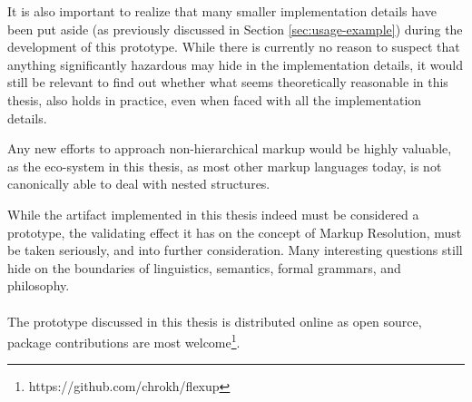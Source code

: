 \documentclass{scrreprt}
\begin{document}
It is also important to realize that many smaller implementation details have been put aside (as previously discussed in Section \ref{sec:usage-example}) during the development of this prototype. While there is currently no reason to suspect that anything significantly hazardous may hide in the implementation details, it would still be relevant to find out whether what seems theoretically reasonable in this thesis, also holds in practice, even when faced with all the implementation details.

Any new efforts to approach non-hierarchical markup would be highly valuable, as the eco-system in this thesis, as most other markup languages today, is not canonically able to deal with nested structures.

While the artifact implemented in this thesis indeed must be considered a prototype, the validating effect it has on the concept of Markup Resolution, must be taken seriously, and into further consideration. Many interesting questions still hide on the boundaries of linguistics, semantics, formal grammars, and philosophy.\\ \\

The prototype discussed in this thesis is distributed online as open source, package contributions are most welcome\footnote{https://github.com/chrokh/flexup}.













%
%
%
%
%
%



\end{document}
